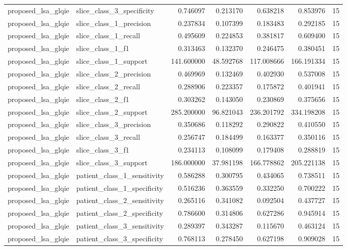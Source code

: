 \begin{tabular}{llrrrrr}
proposed_lsa_glqie & slice_class_3_specificity & 0.746097 & 0.213170 & 0.638218 & 0.853976 & 15 \\
proposed_lsa_glqie & slice_class_1_precision & 0.237834 & 0.107399 & 0.183483 & 0.292185 & 15 \\
proposed_lsa_glqie & slice_class_1_recall & 0.495609 & 0.224853 & 0.381817 & 0.609400 & 15 \\
proposed_lsa_glqie & slice_class_1_f1 & 0.313463 & 0.132370 & 0.246475 & 0.380451 & 15 \\
proposed_lsa_glqie & slice_class_1_support & 141.600000 & 48.592768 & 117.008666 & 166.191334 & 15 \\
proposed_lsa_glqie & slice_class_2_precision & 0.469969 & 0.132469 & 0.402930 & 0.537008 & 15 \\
proposed_lsa_glqie & slice_class_2_recall & 0.288906 & 0.223357 & 0.175872 & 0.401941 & 15 \\
proposed_lsa_glqie & slice_class_2_f1 & 0.303262 & 0.143050 & 0.230869 & 0.375656 & 15 \\
proposed_lsa_glqie & slice_class_2_support & 285.200000 & 96.821043 & 236.201792 & 334.198208 & 15 \\
proposed_lsa_glqie & slice_class_3_precision & 0.350686 & 0.118292 & 0.290822 & 0.410550 & 15 \\
proposed_lsa_glqie & slice_class_3_recall & 0.256747 & 0.184499 & 0.163377 & 0.350116 & 15 \\
proposed_lsa_glqie & slice_class_3_f1 & 0.234113 & 0.108099 & 0.179408 & 0.288819 & 15 \\
proposed_lsa_glqie & slice_class_3_support & 186.000000 & 37.981198 & 166.778862 & 205.221138 & 15 \\
proposed_lsa_glqie & patient_class_1_sensitivity & 0.586288 & 0.300795 & 0.434065 & 0.738511 & 15 \\
proposed_lsa_glqie & patient_class_1_specificity & 0.516236 & 0.363559 & 0.332250 & 0.700222 & 15 \\
proposed_lsa_glqie & patient_class_2_sensitivity & 0.265116 & 0.341082 & 0.092504 & 0.437727 & 15 \\
proposed_lsa_glqie & patient_class_2_specificity & 0.786600 & 0.314806 & 0.627286 & 0.945914 & 15 \\
proposed_lsa_glqie & patient_class_3_sensitivity & 0.289397 & 0.343287 & 0.115670 & 0.463124 & 15 \\
proposed_lsa_glqie & patient_class_3_specificity & 0.768113 & 0.278450 & 0.627198 & 0.909028 & 15 \\

\end{tabular}
